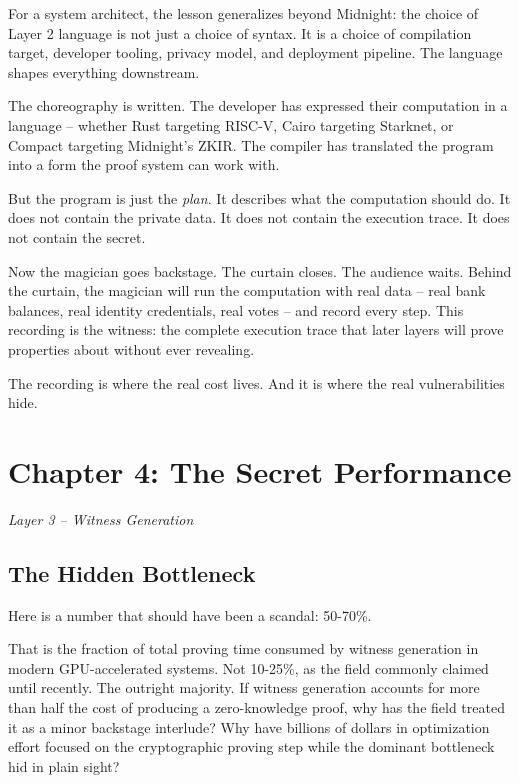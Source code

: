 \documentclass[
  11pt,
  openany]{report}
\begin{document}
For a system architect, the lesson generalizes beyond Midnight: the choice of
Layer 2 language is not just a choice of syntax. It is a choice of compilation
target, developer tooling, privacy model, and deployment pipeline. The language
shapes everything downstream.

\par\vspace{18pt}

The choreography is written. The developer has expressed their computation in a
language -- whether Rust targeting RISC-V, Cairo targeting Starknet, or Compact
targeting Midnight's ZKIR. The compiler has translated the program into a form
the proof system can work with.

But the program is just the \emph{plan}. It describes what the computation
should do. It does not contain the private data. It does not contain the
execution trace. It does not contain the secret.

Now the magician goes backstage. The curtain closes. The audience waits. Behind
the curtain, the magician will run the computation with real data -- real bank
balances, real identity credentials, real votes -- and record every step. This
recording is the witness: the complete execution trace that later layers will
prove properties about without ever revealing.

The recording is where the real cost lives. And it is where the real
vulnerabilities hide.

\chapter{Chapter 4: The Secret
Performance}\label{chapter-4-the-secret-performance}

\emph{Layer 3 -- Witness Generation}

\section{The Hidden Bottleneck}\label{the-hidden-bottleneck}

Here is a number that should have been a scandal: 50-70\%.

That is the fraction of total proving time consumed by witness generation in
modern GPU-accelerated systems. Not 10-25\%, as the field commonly claimed until
recently. The outright majority. If witness generation accounts for more than
half the cost of producing a zero-knowledge proof, why has the field treated it
as a minor backstage interlude? Why have billions of dollars in optimization
effort focused on the cryptographic proving step while the dominant bottleneck
hid in plain sight?
\end{document}
